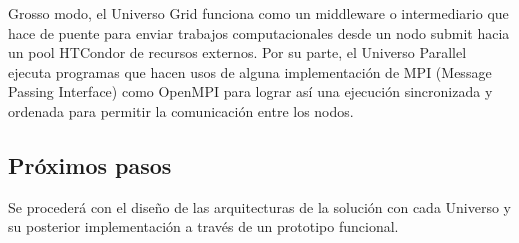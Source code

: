 Grosso modo, el Universo Grid funciona como un middleware o intermediario que hace de puente para enviar trabajos computacionales desde un nodo submit hacia un pool HTCondor de recursos externos. Por su parte, el Universo Parallel ejecuta programas que hacen usos de alguna implementación de MPI (Message Passing Interface) como OpenMPI para lograr así una ejecución sincronizada y ordenada para permitir la comunicación entre los nodos.

\subsection{Próximos pasos}
Se procederá con el diseño de las arquitecturas de la solución con cada Universo y su posterior implementación a través de un prototipo funcional.
